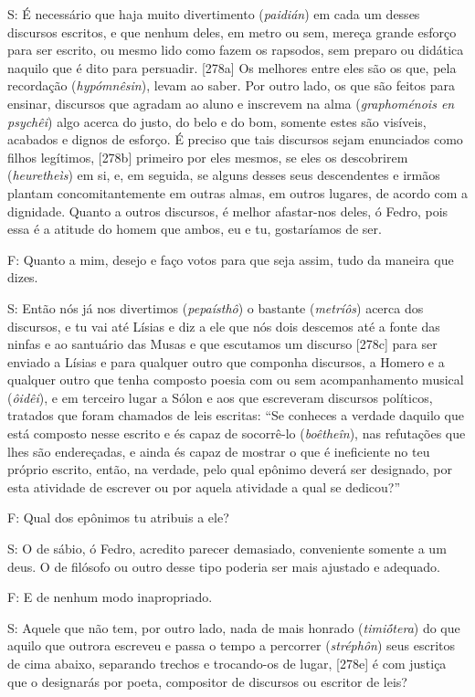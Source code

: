 S: É necessário que haja muito divertimento (\emph{paidián}) em cada um
desses discursos escritos, e que nenhum deles, em metro ou sem, mereça
grande esforço para ser escrito, ou mesmo lido como fazem os rapsodos,
sem preparo ou didática naquilo que é dito para persuadir. {[}278a{]} Os
melhores entre eles são os que, pela recordação (\emph{hypómnêsin}),
levam ao saber. Por outro lado, os que são feitos para ensinar,
discursos que agradam ao aluno e inscrevem na alma (\emph{graphoménois
en psychêi}) algo acerca do justo, do belo e do bom, somente estes são
visíveis, acabados e dignos de esforço. É preciso que tais discursos
sejam enunciados como filhos legítimos, {[}278b{]} primeiro por eles
mesmos, se eles os descobrirem (\emph{heuretheìs}) em si, e, em seguida,
se alguns desses seus descendentes e irmãos plantam concomitantemente em
outras almas, em outros lugares, de acordo com a dignidade. Quanto a
outros discursos, é melhor afastar-nos deles, ó Fedro, pois essa é a
atitude do homem que ambos, eu e tu, gostaríamos de ser.

F: Quanto a mim, desejo e faço votos para que seja assim, tudo da
maneira que dizes.

S: Então nós já nos divertimos (\emph{pepaísthô}) o bastante
(\emph{metríôs}) acerca dos discursos, e tu vai até Lísias e diz a ele
que nós dois descemos até a fonte das ninfas e ao santuário das Musas e
que escutamos um discurso {[}278c{]} para ser enviado a Lísias e para
qualquer outro que componha discursos, a Homero e a qualquer outro que
tenha composto poesia com ou sem acompanhamento musical (\emph{ôidêi}),
e em terceiro lugar a Sólon e aos que escreveram discursos políticos,
tratados que foram chamados de leis escritas: ``Se conheces a verdade
daquilo que está composto nesse escrito e és capaz de socorrê-lo
(\emph{boêtheîn}), nas refutações que lhes são endereçadas, e ainda és
capaz de mostrar o que é ineficiente no teu próprio escrito, então, na
verdade, pelo qual epônimo deverá ser designado, por esta atividade de
escrever ou por aquela atividade a qual se dedicou?''

F: Qual dos epônimos tu atribuis a ele?

S: O de sábio, ó Fedro, acredito parecer demasiado, conveniente somente
a um deus. O de filósofo ou outro desse tipo poderia ser mais ajustado e
adequado.

F: E de nenhum modo inapropriado.

S: Aquele que não tem, por outro lado, nada de mais honrado
(\emph{timiṓtera}) do que aquilo que outrora escreveu e passa o tempo a
percorrer (\emph{stréphôn}) seus escritos de cima abaixo, separando
trechos e trocando-os de lugar, {[}278e{]} é com justiça que o
designarás por poeta, compositor de discursos ou escritor de leis?

